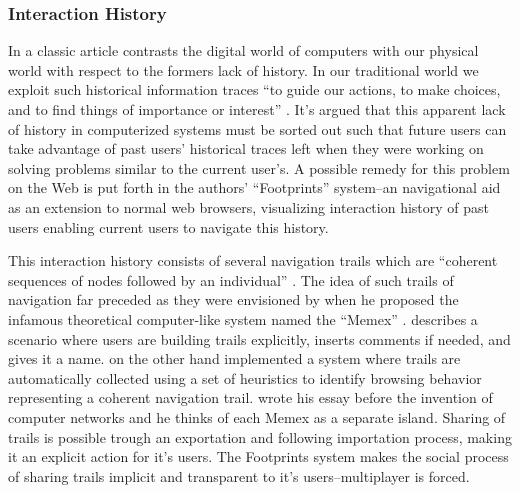 \subsubsection{Interaction History}

In a classic article \citet{wexelblat99} contrasts the digital world of
computers with our physical world with respect to the formers lack of history.
In our traditional world we exploit such historical information traces
  ``to guide our actions, to make choices, and to find things of
  importance or interest'' \citep[p.~270]{wexelblat99}.
It's argued that this apparent lack of history in computerized systems must
be sorted out such that future users can take advantage
of past users' historical traces left when they were working
on solving problems similar to the current user's.
A possible remedy for this problem on the Web is put forth in the authors'
``Footprints'' system--an navigational aid as an extension to normal web
browsers, visualizing interaction history of past users enabling current
users to navigate this history.

This interaction history consists of several navigation trails which are
  ``coherent sequences of nodes followed by an individual''
  \citep[p.~273]{wexelblat99}.
The idea of such trails of navigation far preceded \citeauthor{wexelblat99}
as they were envisioned by \citet{bush45} when he proposed the infamous
theoretical computer-like system named the ``Memex''%
.
\citeauthor{bush45} describes a scenario where users are building trails
explicitly, inserts comments if needed, and gives it a name.
\citeauthor{wexelblat99} on the other hand
implemented a system where trails are automatically collected using a set of
heuristics to identify browsing behavior representing a coherent navigation
trail.
\citeauthor{bush45} wrote his essay before the invention of computer networks
and he thinks of each Memex as a separate island. Sharing of trails is
possible trough an exportation and following importation process, making it an
explicit action for it's users.
The Footprints system makes the social process of sharing trails implicit and
transparent to it's users--multiplayer is forced.

